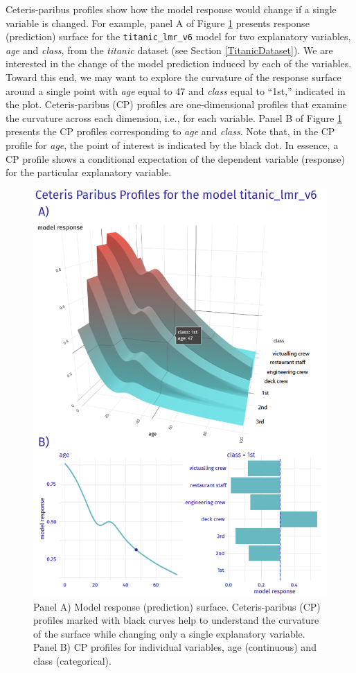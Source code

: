 \documentclass[12pt,]{krantz}
\begin{document}
Ceteris-paribus profiles show how the model response would change if a single variable is changed. For example, panel A of Figure \ref{fig:modelResponseCurveLine} presents response (prediction) surface for the \texttt{titanic\_lmr\_v6} model for two explanatory variables, \emph{age} and \emph{class}, from the \emph{titanic} dataset (see Section \ref{TitanicDataset}). We are interested in the change of the model prediction induced by each of the variables. Toward this end, we may want to explore the curvature of the response surface around a single point with \emph{age} equal to 47 and \emph{class} equal to ``1st,'' indicated in the plot. Ceteris-paribus (CP) profiles are one-dimensional profiles that examine the curvature across each dimension, i.e., for each variable. Panel B of Figure \ref{fig:modelResponseCurveLine} presents the CP profiles corresponding to \emph{age} and \emph{class}. Note that, in the CP profile for \emph{age}, the point of interest is indicated by the black dot. In essence, a CP profile shows a conditional expectation of the dependent variable (response) for the particular explanatory variable.

\begin{figure}

{\centering \includegraphics[width=0.6\linewidth]{figure/profile_age_class} 

}

\caption{Panel A) Model response (prediction) surface. Ceteris-paribus (CP) profiles marked with black curves help to understand the curvature of the surface while changing only a single explanatory variable. Panel B) CP profiles for individual variables, age (continuous) and class (categorical).}\label{fig:modelResponseCurveLine}
\end{figure}
\end{document}
